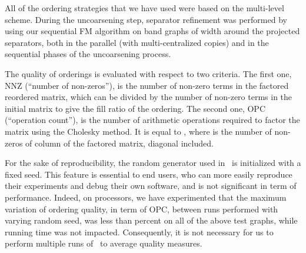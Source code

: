 \documentclass[fleqn,12pt,twoside]{article}
\begin{document}
All of the ordering strategies that we have used were based on the
multi-level scheme. During the uncoarsening step, separator refinement
was performed by using our sequential FM algorithm on band graphs of
width  around the projected separators, both in the parallel
(with multi-centralized copies) and in the sequential phases of the
uncoarsening process.

The quality of orderings is evaluated with respect to two
criteria. The first one, NNZ (``number of non-zeros''), is the number
of non-zero terms in the factored reordered matrix, which can be
divided by the number of non-zero terms in the initial matrix to give
the fill ratio of the ordering. The second one, OPC (``operation
count''), is the number of arithmetic operations required to factor
the matrix using the Cholesky method. It is equal to ,
where  is the number of non-zeros of column  of the factored
matrix, diagonal included.

For the sake of reproducibility, the random generator used in \scotch\
is initialized with a fixed seed. This feature is essential to end
users, who can more easily reproduce their experiments and debug their
own software, and is not significant in term of performance. Indeed,
on  processors, we have experimented that the maximum variation of
ordering quality, in term of OPC, between  runs performed with
varying random seed, was less than  percent on all of the above
test graphs, while running time was not impacted. Consequently,
it is not necessary for us to perform multiple runs of \scotch\ to
average quality measures.
\\
\end{document}
